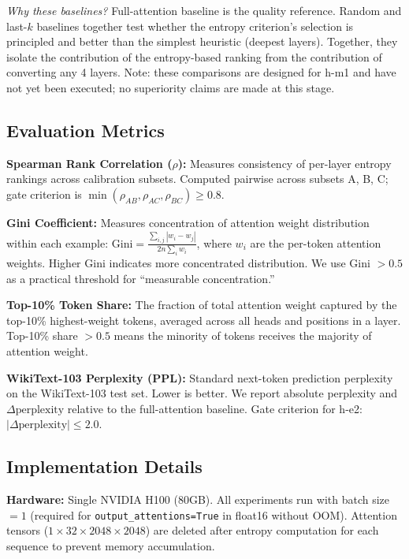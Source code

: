 \textit{Why these baselines?} Full-attention baseline is the quality reference. Random and last-$k$ baselines together test whether the entropy criterion's selection is principled and better than the simplest heuristic (deepest layers). Together, they isolate the contribution of the entropy-based ranking from the contribution of converting any 4 layers. Note: these comparisons are designed for h-m1 and have not yet been executed; no superiority claims are made at this stage.

\subsection{Evaluation Metrics}

\textbf{Spearman Rank Correlation ($\rho$):} Measures consistency of per-layer entropy rankings across calibration subsets. Computed pairwise across subsets A, B, C; gate criterion is $\min(\rho_{AB}, \rho_{AC}, \rho_{BC}) \geq 0.8$.

\textbf{Gini Coefficient:} Measures concentration of attention weight distribution within each example: $\text{Gini} = \frac{\sum_{i,j} |w_i - w_j|}{2 n \sum_i w_i}$, where $w_i$ are the per-token attention weights. Higher Gini indicates more concentrated distribution. We use Gini $> 0.5$ as a practical threshold for ``measurable concentration.''

\textbf{Top-10\% Token Share:} The fraction of total attention weight captured by the top-10\% highest-weight tokens, averaged across all heads and positions in a layer. Top-10\% share $> 0.5$ means the minority of tokens receives the majority of attention weight.

\textbf{WikiText-103 Perplexity (PPL):} Standard next-token prediction perplexity on the WikiText-103 test set. Lower is better. We report absolute perplexity and $\Delta\text{perplexity}$ relative to the full-attention baseline. Gate criterion for h-e2: $|\Delta\text{perplexity}| \leq 2.0$.

\subsection{Implementation Details}

\textbf{Hardware:} Single NVIDIA H100 (80GB). All experiments run with batch size $= 1$ (required for \texttt{output\_attentions=True} in float16 without OOM). Attention tensors ($1 \times 32 \times 2048 \times 2048$) are deleted after entropy computation for each sequence to prevent memory accumulation.

